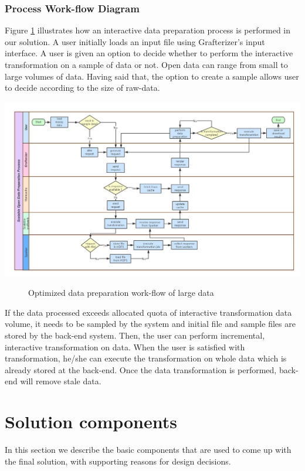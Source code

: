 \subsubsection{Process Work-flow Diagram}
Figure \ref{fig:workflow} illustrates how an interactive data preparation process is performed in our solution. A user initially loads an input file using Grafterizer's input interface. A user is given an option to decide whether to perform the interactive transformation on a sample of data or not. Open data can range from small to large volumes of data. Having said that, the option to create a sample allows user to decide according to the size of raw-data. 
\begin{center}
	\includegraphics[width=55em, angle=90]{./Figures/work-flow}
	\begin{figure}[htbp]
    \caption{Optimized data preparation work-flow of large data}
    \label{fig:workflow}
	\end{figure}
\end{center}
If the data processed exceeds allocated quota of interactive transformation data volume, it needs to be sampled by the system and initial file and sample files are stored by the back-end system. Then, the user can perform incremental, interactive transformation on data. When the user is satisfied with transformation, he/she can execute the transformation on whole data which is already stored at the back-end. Once the data transformation is performed, back-end will remove stale data.

\section{Solution components}
In this section we describe the basic components that are used to come up with the final solution, with supporting reasons for design decisions. 

